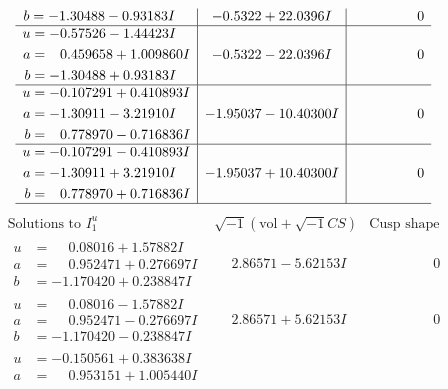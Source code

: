 \documentclass[1p]{elsarticle_modified}
\theoremstyle{definition}
\newcommand{\I}{\sqrt{-1}}
\begin{document}
$$\begin{array}{c|c|c}
\begin{aligned}
b &= -1.30488 - 0.93183 I\end{aligned}
 & -0.5322 + 22.0396 I & \phantom{-0.000000 } 0 \\ \hline\begin{aligned}
u &= -0.57526 - 1.44423 I \\
a &= \phantom{-}0.459658 + 1.009860 I \\
b &= -1.30488 + 0.93183 I\end{aligned}
 & -0.5322 - 22.0396 I & \phantom{-0.000000 } 0 \\ \hline\begin{aligned}
u &= -0.107291 + 0.410893 I \\
a &= -1.30911 - 3.21910 I \\
b &= \phantom{-}0.778970 - 0.716836 I\end{aligned}
 & -1.95037 - 10.40300 I & \phantom{-0.000000 } 0 \\ \hline\begin{aligned}
u &= -0.107291 - 0.410893 I \\
a &= -1.30911 + 3.21910 I \\
b &= \phantom{-}0.778970 + 0.716836 I\end{aligned}
 & -1.95037 + 10.40300 I & \phantom{-0.000000 } 0\\
 \hline 
 \end{array}$$\newpage$$\begin{array}{c|c|c}  
\text{Solutions to }I^u_{1}& \I (\text{vol} + \sqrt{-1}CS) & \text{Cusp shape}\\
 \hline 
\begin{aligned}
u &= \phantom{-}0.08016 + 1.57882 I \\
a &= \phantom{-}0.952471 + 0.276697 I \\
b &= -1.170420 + 0.238847 I\end{aligned}
 & \phantom{-}2.86571 - 5.62153 I & \phantom{-0.000000 } 0 \\ \hline\begin{aligned}
u &= \phantom{-}0.08016 - 1.57882 I \\
a &= \phantom{-}0.952471 - 0.276697 I \\
b &= -1.170420 - 0.238847 I\end{aligned}
 & \phantom{-}2.86571 + 5.62153 I & \phantom{-0.000000 } 0 \\ \hline\begin{aligned}
u &= -0.150561 + 0.383638 I \\
a &= \phantom{-}0.953151 + 1.005440 I \\

\end{aligned}
\end{array}$$
\end{document}
